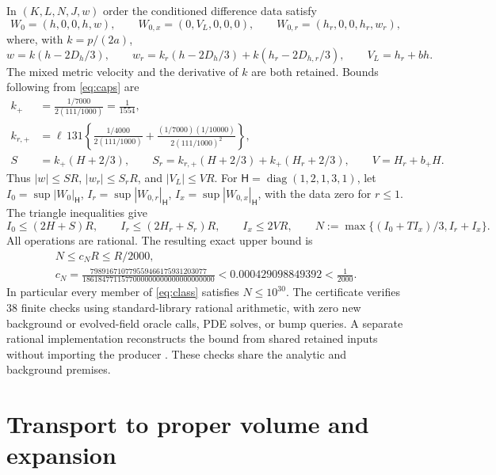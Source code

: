 \documentclass[11pt]{article}
\begin{document}
In $(K,L,N,J,w)$ order the conditioned difference data satisfy
\begin{equation}
 W_0=(h,0,0,h,w),\qquad W_{0,x}=(0,V_L,0,0,0),\qquad
 W_{0,r}=(h_r,0,0,h_r,w_r),
 \label{eq:initialvectors}
\end{equation}
where, with $k=p/(2a)$,
\begin{equation}
 w=k(h-2D_h/3),\qquad
 w_r=k_r(h-2D_h/3)+k(h_r-2D_{h,r}/3),\qquad
 V_L=h_r+bh.
 \label{eq:adapter}
\end{equation}
The mixed metric velocity and the derivative of $k$ are both retained.
Bounds following from \eqref{eq:caps} are
\begin{align}
 k_+&=\frac{1/7000}{2(111/1000)}=\frac1{1554},\nonumber\\
 k_{r,+}&=\ell\,131\left\{\frac{1/4000}{2(111/1000)}
              +\frac{(1/7000)(1/10000)}{2(111/1000)^2}\right\},\nonumber\\
 S&=k_+(H+2/3),\qquad
 S_r=k_{r,+}(H+2/3)+k_+(H_r+2/3),\qquad
 V=H_r+b_+H.
 \label{eq:componentcaps}
\end{align}
Thus $|w|\le SR$, $|w_r|\le S_rR$, and $|V_L|\le VR$.
For $\mathsf H=\operatorname{diag}(1,2,1,3,1)$, let
$I_0=\sup|W_0|_{\mathsf H}$, $I_r=\sup|W_{0,r}|_{\mathsf H}$,
$I_x=\sup|W_{0,x}|_{\mathsf H}$, with the data zero for $r\le1$.
The triangle inequalities give
\begin{equation}
 I_0\le(2H+S)R,\qquad I_r\le(2H_r+S_r)R,\qquad
 I_x\le2VR,\qquad
 N:=\max\{(I_0+TI_x)/3,I_r+I_x\}.
 \label{eq:N}
\end{equation}
All operations are rational. The resulting exact upper bound is
\begin{equation}
 \begin{gathered}
 N\le c_NR\le R/2000,\\
 c_N=
 \frac{798916710779559466175931203077}
      {1861847711577000000000000000000000}
 <0.000429098849392<\frac1{2000}.
 \end{gathered}
 \label{eq:Nrational}
\end{equation}
In particular every member of \eqref{eq:class} satisfies $N\le10^{30}$.
The certificate verifies 38 finite checks using standard-library rational
arithmetic, with zero new background or evolved-field oracle calls, PDE
solves, or bump queries. A separate rational implementation reconstructs
the bound from shared retained inputs without importing the producer
\cite{records}. These checks share the analytic and background premises.

\section{Transport to proper volume and expansion}\label{sec:transfer}
\end{document}
